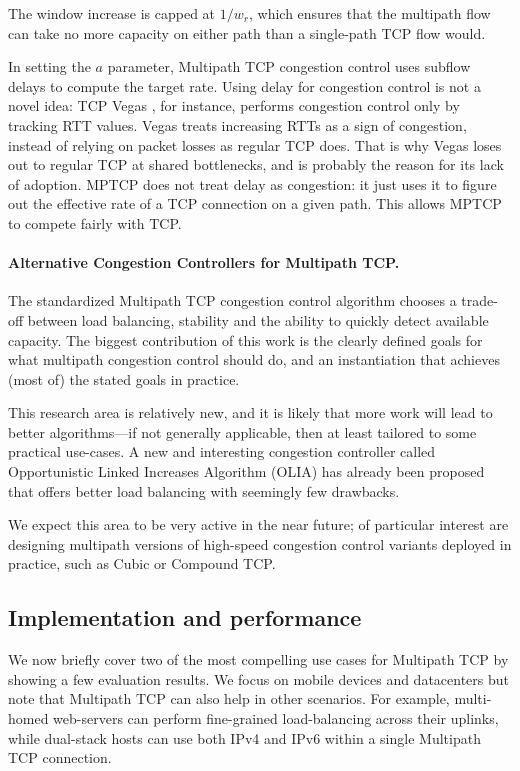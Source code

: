 The window increase is capped at $1/w_r$, which ensures that
the multipath flow can take no more capacity on either path than a
single-path TCP flow would.

In setting the $a$ parameter, Multipath TCP congestion control uses subflow delays to compute the target rate.
Using delay for congestion control is not a novel idea: TCP Vegas \cite{vegas}, for instance, performs
congestion control only by tracking RTT values. Vegas treats increasing RTTs as a sign of congestion, instead
of relying on packet losses as regular TCP does. That is why Vegas loses out to regular TCP at shared bottlenecks,
and is probably the reason for its lack of adoption. MPTCP does not treat delay as congestion: it just uses it
to figure out the effective rate of a TCP connection on a given path. This allows MPTCP to compete fairly with TCP.

\paragraph{Alternative Congestion Controllers for Multipath TCP.} The standardized Multipath
TCP congestion control algorithm chooses a trade-off between load balancing, stability and
the ability to quickly detect available capacity. The biggest contribution of this
work is the clearly defined goals for what multipath congestion control should do,
and an instantiation that achieves (most of) the stated goals in practice.

This research area is relatively new, and it is likely that more work will lead to better 
algorithms---if not generally applicable, then at least tailored to some practical use-cases.
A new and interesting congestion controller called Opportunistic Linked Increases Algorithm (OLIA) 
has already been proposed \cite{olia} that offers better load balancing with seemingly few drawbacks.

We expect this area to be very active in the near future; of particular interest are designing multipath
versions of high-speed congestion control variants deployed in practice, such as Cubic or Compound TCP. 



\subsection{Implementation and performance}

We now briefly cover two of the most compelling use cases for
Multipath TCP by showing a few evaluation results. We focus on mobile
devices and datacenters but note that Multipath TCP can also help in
other scenarios.  For example, multi-homed web-servers can perform
fine-grained load-balancing across their uplinks, while dual-stack
hosts can use both IPv4 and IPv6 within a single Multipath TCP
connection.

